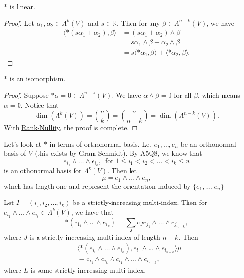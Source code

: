 \documentclass[notoc,notitlepage]{tufte-book}
\begin{document}
\begin{propo}[$*$ is linear]\label{propo:_is_linear}
  $*$ is linear.
\end{propo}

\begin{proof}
  Let $\alpha_1, \alpha_2 \in \Lambda^k(V)$ and $s \in \mathbb{R}$. Then for any
  $\beta \in \Lambda^{n-k}(V)$, we have
  \begin{align*}
    \langle *(s\alpha_1 + \alpha_2), \beta \rangle
    &= (s\alpha_1 + \alpha_2) \land \beta \\
    &= s\alpha_1 \land \beta + \alpha_2 \land \beta \\
    &= s \langle *\alpha_1, \beta \rangle + \langle *\alpha_2, \beta \rangle.
  \end{align*}
\end{proof}

\begin{propo}[$*$ is an isomorphism]\label{propo:_is_an_isomorphism}
  $*$ is an isomorphism.
\end{propo}

\begin{proof}
  Suppose $* \alpha = 0 \in \Lambda^{n-k}(V)$. We have  $\alpha \land \beta = 0$
  for all $\beta$, which means $\alpha = 0$. Notice that
   \begin{equation*}
     \dim (\Lambda^k(V)) = \binom{n}{k} = \binom{n}{n-k} =
     \dim(\Lambda^{n-k}(V)).
  \end{equation*}
  With \hyperref[thm:rank_nullity_theorem]{Rank-Nullity}, the proof is complete.
\end{proof}

Let's look at $*$ in terms of orthonormal basis. Let $e_1, \ldots, e_n$ be an
orthonormal basis of $V$ (this exists by Gram-Schmidt). By A5Q8, we know that
\begin{equation*}
  e_{i_1} \land \hdots \land e_{i_k}, \, \text{ for } 1 \leq i_1 < i_2 < \hdots
  < i_k \leq n
\end{equation*}
is an othonormal basis for $\Lambda^k(V)$. Then let
\begin{equation*}
  \mu = e_1 \land \hdots \land e_n,
\end{equation*}
which has length one and represent the orientation induced by $\{ e_1, \ldots,
e_n\}$.

Let $I = (i_1, i_2, \ldots, i_k)$ be a strictly-increasing multi-index. Then for
$e_{i_1} \land \hdots \land e_{i_k} \in \Lambda^k(V)$, we have that
\begin{equation*}
  *(e_{1_i} \land \hdots \land e_{i_k}) = \sum_{J} c_J e_{j_1} \land \hdots
  \land e_{j_{n-k}},
\end{equation*}
where $J$ is a strictly-increasing multi-index of length $n - k$.
Then
\begin{align*}
  &\langle *(e_{i_1} \land \hdots \land e_{i_k}), e_{l_1} \land \hdots \land 
  e_{l_{n-k}} \rangle \mu \\
  &= e_{i_1} \land e_{i_k} \land e_{l_1} \land \hdots \land e_{l_{n-k}},
\end{align*}
where $L$ is some strictly-increasing multi-index.
\end{document}
